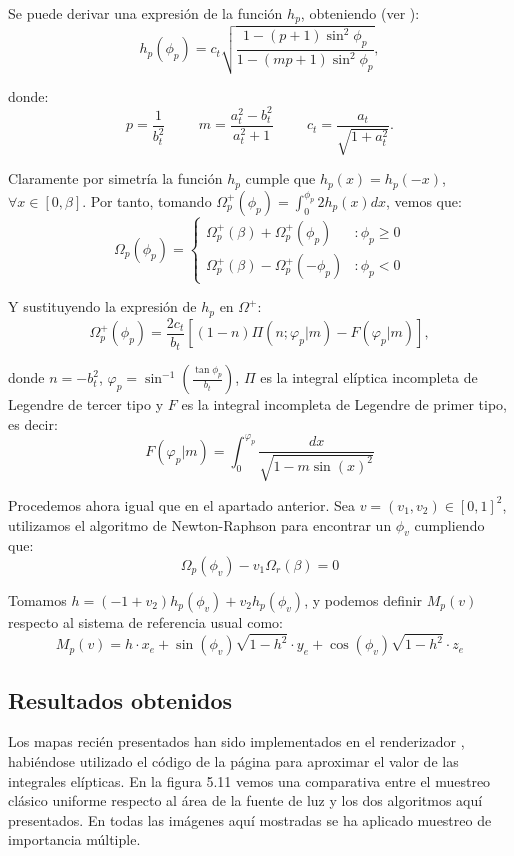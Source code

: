 Se puede derivar una expresión de la función $h_p$, obteniendo (ver \cite{Guillen2017}):
$$h_p(\phi_p)=c_t\sqrt{\frac{1-(p+1)\sin^2\phi_p}{1-(mp+1)\sin^2\phi_p}},$$

donde:
$$p=\frac{1}{b_t^2} \hspace{1cm} m=\frac{a_t^2-b_t^2}{a_t^2+1} \hspace{1cm} c_t=\frac{a_t}{\sqrt{1+a_t^2}}.$$

Claramente por simetría la función $h_p$ cumple que $h_p(x) = h_p(-x)$, $\forall x \in [0,\beta]$. Por tanto, tomando $\Omega_p^+(\phi_p)=\int_0^{\phi_p}2h_p(x)dx$, vemos que:
\[ \Omega_p(\phi_p) =
   \begin{cases}
      \Omega_p^+(\beta)+\Omega_p^+(\phi_p) & :\phi_p\geq0 \\
      \Omega_p^+(\beta)-\Omega_p^+(-\phi_p) & :\phi_p <0
   \end{cases}
  \]

Y sustituyendo la expresión de $h_p$ en $\Omega^+$:
$$\Omega_p^+(\phi_p)=\frac{2c_t}{b_t}[(1-n)\Pi(n;\varphi_p|m)-F(\varphi_p|m)],$$

donde $n=-b_t^2$, $\varphi_p=\sin^{-1}(\frac{\tan\phi_p}{b_t})$, $\Pi$ es la integral elíptica incompleta de Legendre de tercer tipo y $F$ es la integral incompleta de Legendre de primer tipo, es decir:
$$F(\varphi_p | m) = \int_0^{\varphi_p}\frac{dx}{\sqrt{1-m\sin(x)^2}} $$

Procedemos ahora igual que en el apartado anterior. Sea $v=(v_1,v_2)\in[0,1]^2$, utilizamos el algoritmo de Newton-Raphson para encontrar un $\phi_v$ cumpliendo que:
$$\Omega_p(\phi_v)-v_1\Omega_r(\beta) = 0 $$

Tomamos $h = (-1+v_2)h_p(\phi_v) + v_2h_p(\phi_v)$, y podemos definir $M_p(v)$ respecto al sistema de referencia usual como:
$$M_p(v) = h\cdot x_e +\sin(\phi_v)\sqrt{1-h^2}\cdot y_e + \cos(\phi_v)\sqrt{1-h^2}\cdot z_e$$

\subsection{Resultados obtenidos}

Los mapas recién presentados han sido implementados en el renderizador \cite{pbrtCode}, habiéndose utilizado el código de la página \cite{codigoIntegralEliptica} para aproximar el valor de las integrales elípticas. En la figura 5.11 vemos una comparativa entre el muestreo clásico uniforme respecto al área de la fuente de luz y los dos algoritmos aquí presentados. En todas las imágenes aquí mostradas se ha aplicado muestreo de importancia múltiple.

